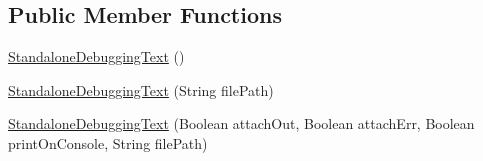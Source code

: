 \subsection*{Public Member Functions}
\begin{DoxyCompactItemize}
\item 
\hyperlink{classit_1_1emarolab_1_1cagg_1_1debugging_1_1StandaloneDebuggingText_a9c6a1c0bd1e9cf0cc8c10d059e8d8280}{Standalone\-Debugging\-Text} ()
\item 
\hyperlink{classit_1_1emarolab_1_1cagg_1_1debugging_1_1StandaloneDebuggingText_ab244d0cee4a5ba36e78d0ad2c795b404}{Standalone\-Debugging\-Text} (String file\-Path)
\item 
\hyperlink{classit_1_1emarolab_1_1cagg_1_1debugging_1_1StandaloneDebuggingText_ad5cf4f8071d90926539e23d7213c5abc}{Standalone\-Debugging\-Text} (Boolean attach\-Out, Boolean attach\-Err, Boolean print\-On\-Console, String file\-Path)
\end{DoxyCompactItemize}
